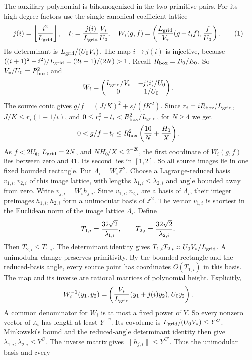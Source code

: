 The auxiliary polynomial is bihomogenized in the two primitive pairs.
For its high-degree factors use the single canonical coefficient lattice
\[
 j(i)=\left\lfloor\frac{i^2}{L_{\rm grid}}\right\rfloor,\quad
 t_i=\frac{j(i)}{L_{\rm grid}}\frac{V_*}{U_0},\quad
 W_i(g,f)=\left(\frac{L_{\rm grid}}{V_*}(g-t_if),\frac f{U_0}\right).
\AutoTag{eq:old:7_11}
\]
Its determinant is \(L_{\rm grid}/(U_0V_*)\). The map \(i\mapsto j(i)\)
is injective, because
\(((i+1)^2-i^2)/L_{\rm grid}=(2i+1)/(2N)>1\).
Recall \(R_{\rm box}=D_0/E_0\). So \(V_*/U_0=R_{\rm box}^2\), and
\[
 W_i=\begin{pmatrix}L_{\rm grid}/V_*&-j(i)/U_0\\0&1/U_0\end{pmatrix}.
\]
The source conic gives
\(g/f=(J/K)^2+s/(fK^2)\). Since
\(r_i=iR_{\rm box}/L_{\rm grid}\), \(J/K\le r_i(1+1/i)\), and
\(0\le r_i^2-t_i<R_{\rm box}^2/L_{\rm grid}\), for \(N\ge4\) we get
\[
 0<g/f-t_i\le R_{\rm box}^2\left({10\over N}+{H_0\over X}\right).
\]
As \(f<2U_0\), \(L_{\rm grid}=2N\), and
\(NH_0/X\le2^{-20}\), the first coordinate of \(W_i(g,f)\) lies
between zero and \(41\). Its second lies in \([1,2]\). So all
source images lie in one fixed bounded rectangle. Put
\(\Lambda_i=W_i\mathbb Z^2\). Choose a Lagrange-reduced basis
\(v_{1,i},v_{2,i}\) of this image lattice, with lengths
\(\lambda_{1,i}\le\lambda_{2,i}\) and angle bounded away from zero.
Write \(v_{j,i}=W_i h_{j,i}\). Since \(v_{1,i},v_{2,i}\) are a basis
of \(\Lambda_i\), their integer preimages \(h_{1,i},h_{2,i}\) form a
unimodular basis of \(\mathbb Z^2\). The vector \(v_{1,i}\) is shortest
in the Euclidean norm of the image lattice \(\Lambda_i\). Define
\[
 T_{1,i}={32\sqrt2\over\lambda_{1,i}},\qquad
 T_{2,i}={32\sqrt2\over\lambda_{2,i}}.
\]
Then \(T_{2,i}\le T_{1,i}\). The determinant identity gives
\(T_{1,i}T_{2,i}\asymp U_0V_*/L_{\rm grid}\). A unimodular change
preserves primitivity. By the bounded rectangle and the reduced-basis
angle, every source point has coordinates
\(O(T_{1,i})\) in this basis. The map and its inverse are rational matrices of
polynomial height. Explicitly,
\[
 W_i^{-1}(y_1,y_2)=
 \left({V_*\over L_{\rm grid}}(y_1+j(i)y_2),U_0y_2\right).
\]
A common denominator for \(W_i\) is at most a fixed power of \(Y\). So
every nonzero vector of \(\Lambda_i\) has length at least \(Y^{-C}\).
Its covolume is \(L_{\rm grid}/(U_0V_*)\le Y^C\). Minkowski's bound
and the reduced-angle determinant identity then give
\(\lambda_{1,i},\lambda_{2,i}\le Y^C\). The inverse matrix gives
\(\lVert h_{j,i}\rVert\le Y^{C'}\). Thus the unimodular basis and every
